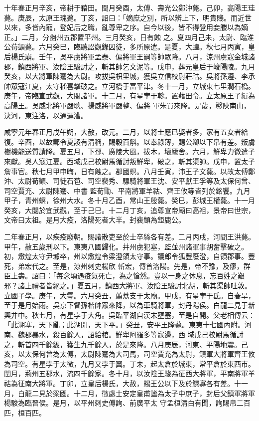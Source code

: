 \begin{pinyinscope}
 十年春正月辛亥，帝耕于藉田。閏月癸酉，太傅、壽光公鄭沖薨。己卯，高陽王珪薨。庚辰，太原王瑰薨。丁亥，詔曰：「嫡庶之別，所以辨上下，明貴賤。而近世以來，多皆內寵，登妃后之職，亂尊卑之序。自今以後，皆不得登用妾媵以為嫡正。」二月，分幽州五郡置平州。三月癸亥，日有蝕
 之。夏四月己未，太尉、臨淮公荀顗薨。六月癸巳，臨聽訟觀錄囚徒，多所原遣。是夏，大蝗。秋七月丙寅，皇后楊氏崩。壬午，吳平虜將軍孟泰、偏將軍王嗣等帥眾降。八月，涼州虜寇金城諸郡，鎮西將軍、汝陰王駿討之，斬其帥乞文泥等。戊申，葬元皇后于峻陽陵。九月癸亥，以大將軍陳騫為大尉。攻拔吳枳里城，獲吳立信校尉莊祜。吳將孫遵、李承帥眾寇江夏，太守嵇喜擊破之。立河橋于富平津。冬十一月，立城東七里澗石橋。庚午，帝臨宣武觀，大閱諸軍。十二月，有星孛于軫。置藉田令。立太原王子緝為高陽王。吳威北將軍嚴聰、揚威將軍嚴整、偏將
 軍朱買來降。是歲，鑿陜南山，決河，東注洛，以通運漕。



 咸寧元年春正月戊午朔，大赦，改元。二月，以將士應已娶者多，家有五女者給復。辛酉，以故鄴令夏謖有清稱，賜穀百斛。以奉祿薄，賜公卿以下帛有差。叛虜樹機能送質請降。夏五月，下邳、廣陵大風，拔木，壞廬舍。六月，鮮卑力微遣子來獻。吳人寇江夏。西域戊己校尉馬循討叛鮮卑，破之，斬其渠帥。戊申，置太子詹事官。秋七月甲申晦，日有蝕之。郡國螟。八月壬寅，沛王子文薨。以故太傅鄭沖、太尉荀顗、司徒石苞、司空裴秀、驃騎將軍王沈、安平獻王孚等及太保何曾、司空賈充、太尉陳騫、中書
 監荀勖、平南將軍羊祜、齊王攸等皆列於銘饗。九月甲子，青州螟，徐州大水。冬十月乙酉，常山王殷薨。癸巳，彭城王權薨。十一月癸亥，大閱於宜武觀，至于己巳。十二月丁亥，追尊宣帝廟曰高祖，景帝曰世宗，文帝曰太祖。是月大疫，洛陽死者大半。封裴頠為鉅鹿公。



 二年春正月，以疾疫廢朝。賜諸散吏至於士卒絲各有差。二月丙戌，河間王洪薨。甲午，赦五歲刑以下。東夷八國歸化。并州虜犯塞，監並州諸軍事胡奮擊破之。初，燉煌太守尹璩卒，州以燉煌令梁澄領太守事。議郎令狐豐廢澄，自領郡事。豐死，弟宏代之。至是，涼州刺史楊欣
 斬宏，傳首洛陽。先是，帝不豫，及瘳，群臣上壽。詔曰：「每念頃遇疫氣死亡，為之愴然。豈以一身之休息，忘百姓之艱邪？諸上禮者皆絕之。」夏五月，鎮西大將軍、汝陰王駿討北胡，斬其渠帥吐敦。立國子學。庚午，大雩。六月癸丑，薦荔支于太廟。甲戌，有星孛于氐。自春旱，至于是月始雨。吳京下督孫楷帥眾來降，以為車騎將軍，封丹陽侯。白龍二見于新興井中。秋七月，有星孛于大角。吳臨平湖自漢末壅塞，至是自開。父老相傳云：「此湖塞，天下亂；此湖開，天下平。」癸丑，安平王隆薨。東夷十七國內附。河南、魏郡暴水，殺百餘人，詔給棺。鮮卑阿羅多等寇邊，西
 域戊己校尉馬循討之，斬首四千餘級，獲生九千餘人，於是來降。八月庚辰，河東、平陽地震。己亥，以太保何曾為太傅，太尉陳騫為大司馬，司空賈充為太尉，鎮軍大將軍齊王攸為司空。有星孛于太微，九月又孛于翼。丁未，起太倉於城東，常平倉於東西市。閏月，荊州五郡水，流四千餘家。冬十月，以汝陰王駿為征西大將軍，平南將軍羊祜為征南大將軍。丁卯，立皇后楊氏，大赦，賜王公以下及於鰥寡各有差。十一月，白龍二見於梁國。十二月，徵處士安定皇甫謐為太子中庶子，封后父鎮軍將軍楊駿為臨晉侯。是月，以平州刺史傅詢、前廣平太
 守孟桓清白有聞，詢賜帛二百匹，桓百匹。




\end{pinyinscope}
